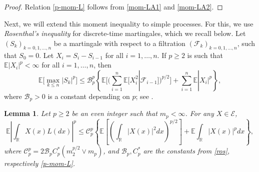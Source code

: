\documentclass[12pt]{article}
\newtheorem{lemma}[theorem]{Lemma}
\def\cB{\mathcal{B}}
\def\cC{\mathcal{C}}
\def\cE{\mathcal{E}}
\def\cF{\mathcal{F}}
\def\bE{\mathbb{E}}
\def\bR{\mathbb{R}}
\begin{document}
\begin{proof}
Relation \eqref{p-mom-L} follows from \eqref{mom-LA1} and \eqref{mom-LA2}.
\end{proof}





Next, we will extend this moment inequality to simple processes. For this, we use {\em Rosenthal's inequality} for discrete-time martingales, which we recall below. Let $(S_k)_{k=0,1,\ldots,n}$ be a martingale with respect to a filtration $(\cF_k)_{k=0,1,\ldots,n}$, such that $S_0=0$. Let $X_i=S_i-S_{i-1}$ for all $i=1,\ldots,n$. If $p \geq 2$ is such that $\bE|X_i|^p<\infty$ for all $i=1,\ldots,n$, then
\begin{equation}
\label{ros}
\bE\big[\max_{k\leq n}|S_k|^p\big] \leq \cB_p^p \left\{ \bE \Big[ \Big( \sum_{i=1}^n \bE[X_i^2|\cF_{i-1}] \Big)^{p/2} \Big]+\sum_{i=1}^{n}\bE|X_i|^p \right\},
\end{equation}
where $\cB_p>0$ is a constant depending on $p$; see \cite{burkholder73, merlevede-peligrad13}.

\begin{lemma}
\label{lem-simple}
Let $p \geq 2$ be an even integer such that $m_{p}<\infty$.
For any $X \in \cE$,
\[
\bE\left|\int_{\bR}X(x)L(dx) \right|^p \leq \cC_p^p \left\{
\bE\left[ \left( \int_{\bR}|X(x)|^2 dx\right)^{p/2}\right]+ \bE \int_{\bR}|X(x)|^p dx\right\},
\]
where $\cC_p^p=2 \cB_p C_p^* (m_2^{p/2} \vee m_p)$, and $\cB_p,C_p^*$ are the constants from \eqref{ros}, respectively \eqref{p-mom-L}.
\end{lemma}
\end{document}
